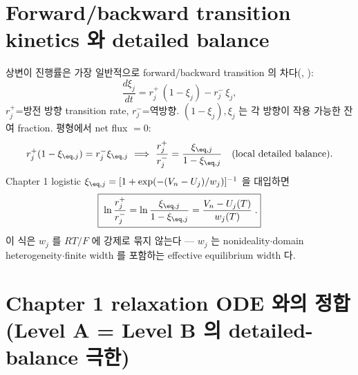 \section{Forward/backward transition kinetics 와 detailed balance}\label{sec:ch3_db}
상변이 진행률은 가장 일반적으로 forward/backward transition 의 차다(\cite{eyring1935,degrootmazur1962}, ):
\begin{equation}
\frac{d\xi_j}{dt}=r_j^+\,(1-\xi_j)-r_j^-\,\xi_j,
\label{eq:ch3_fb}
\end{equation}
$r_j^+$=방전 방향 transition rate, $r_j^-$=역방향. $(1-\xi_j),\xi_j$ 는 각 방향이 작용 가능한 잔여
fraction. 평형에서 net flux $=0$:
\begin{equation}
r_j^+(1-\xi_{\eq,j})=r_j^-\xi_{\eq,j}
\ \Longrightarrow\
\frac{r_j^+}{r_j^-}=\frac{\xi_{\eq,j}}{1-\xi_{\eq,j}}\quad(\text{local detailed balance}).
\label{eq:ch3_db}
\end{equation}
Chapter 1 logistic $\xi_{\eq,j}=[1+\exp(-(V_n-U_j)/w_j)]^{-1}$ 을 대입하면
\begin{equation}
\boxed{\;\ln\frac{r_j^+}{r_j^-}=\ln\frac{\xi_{\eq,j}}{1-\xi_{\eq,j}}=\frac{V_n-U_j(T)}{w_j(T)}\;.}
\label{eq:ch3_db_width}
\end{equation}
이 식은 $w_j$ 를 $RT/F$ 에 강제로 묶지 않는다 — $w_j$ 는 nonideality$\cdot$domain heterogeneity$\cdot$finite
width 를 포함하는 effective equilibrium width 다.

\section{Chapter 1 relaxation ODE 와의 정합 (Level A = Level B 의 detailed-balance 극한)}\label{sec:ch3_consistency}
